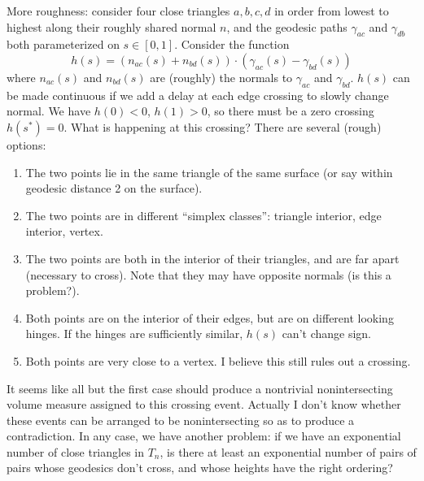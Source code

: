 \documentclass[11pt]{article}
\begin{document}
More roughness: consider four close triangles $a,b,c,d$ in order from lowest to highest along their roughly
shared normal $n$, and the geodesic paths $\gamma_{ac}$ and $\gamma_{db}$ both parameterized on $s \in [0,1]$.
Consider the function
$$h(s) = (n_{ac}(s) + n_{bd}(s)) \cdot \left(\gamma_{ac}(s) - \gamma_{bd}(s)\right)$$
where $n_{ac}(s)$ and $n_{bd}(s)$ are (roughly) the normals to $\gamma_{ac}$ and $\gamma_{bd}$.  $h(s)$ can
be made continuous if we add a delay at each edge crossing to slowly change normal.
We have $h(0) < 0$, $h(1) > 0$, so there must be a zero crossing $h(s^*) = 0$.  What is happening at this
crossing?  There are several (rough) options:
\begin{enumerate}
\item The two points lie in the same triangle of the same surface (or say within geodesic distance 2 on the surface).
\item The two points are in different ``simplex classes'': triangle interior, edge interior, vertex.
\item The two points are both in the interior of their triangles, and are far apart (necessary to cross).
      Note that they may have opposite normals (is this a problem?).
\item Both points are on the interior of their edges, but are on different looking hinges.  If the hinges
      are sufficiently similar, $h(s)$ can't change sign.
\item Both points are very close to a vertex.  I believe this still rules out a crossing.
\end{enumerate}
It seems like all but the first case should produce a nontrivial nonintersecting volume measure assigned to
this crossing event.  Actually I don't know whether these events can be arranged to be nonintersecting so
as to produce a contradiction.  In any case, we have another problem: if we have an exponential number of
close triangles in $T_n$, is there at least an exponential number of pairs of pairs whose geodesics don't
cross, and whose heights have the right ordering?
\end{document}
